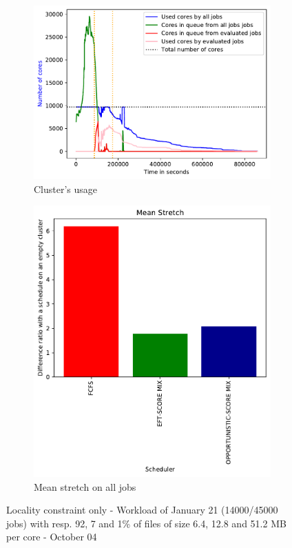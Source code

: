 \documentclass[a4paper]{article}
\begin{document}
\begin{figure}[H]\centering
\begin{subfigure}[b]{0.4\linewidth}\centering\includegraphics[width=1\linewidth]{MBSS/plot/2022-01-21->2022-01-21_V9271_Fcfs_Used_nodes_450_128_32_256_4_1024.pdf}\caption{Cluster's usage}\end{subfigure}
\begin{subfigure}[b]{0.4\linewidth}\centering\includegraphics[width=0.9\linewidth]{MBSS/plot/Results_FCFS_Score_Adaptative_Multiplier_2022-01-21->2022-01-21_V9271_Mean_Stretch_450_128_32_256_4_1024.pdf}\caption{Mean stretch on all jobs}\end{subfigure}
\caption{Locality constraint only - Workload of January 21 (14000/45000 jobs) with resp. 92, 7 and 1\% of files of size 6.4, 12.8 and 51.2 MB per core - October 04}\end{figure}
\end{document}

